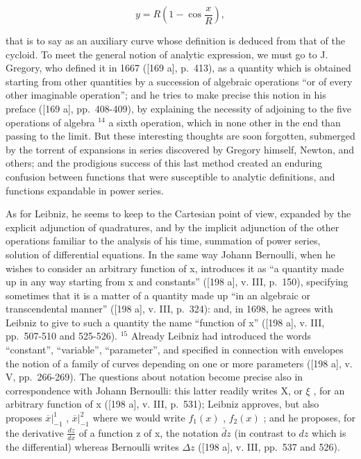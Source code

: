 \[
y = R \left(1 - \cos \frac {x}{R}\right),
\]

that is to say as an auxiliary curve whose definition is deduced from that of the cycloid. To meet the general notion of analytic expression, we must go to J. Gregory, who defined it in 1667 ({[}169 a{]}, p.~413), as a quantity which is obtained starting from other quantities by a succession of algebraic operations ``or of every other imaginable operation''; and he tries to make precise this notion in his preface ({[}169 a{]}, pp.~408-409), by explaining the necessity of adjoining to the five operations of algebra \(^{14}\) a sixth operation, which in none other in the end than passing to the limit. But these interesting thoughts are soon forgotten, submerged by the torrent of expansions in series discovered by Gregory himself, Newton, and others; and the prodigious success of this last method created an enduring confusion between functions that were susceptible to analytic definitions, and functions expandable in power series.

As for Leibniz, he seems to keep to the Cartesian point of view, expanded by the explicit adjunction of quadratures, and by the implicit adjunction of the other operations familiar to the analysis of his time, summation of power series, solution of differential equations. In the same way Johann Bernoulli, when he wishes to consider an arbitrary function of x, introduces it as ``a quantity made up in any way starting from x and constants'' ({[}198 a{]}, v. III, p.~150), specifying sometimes that it is a matter of a quantity made up ``in an algebraic or transcendental manner'' ({[}198 a{]}, v. III, p.~324): and, in 1698, he agrees with Leibniz to give to such a quantity the name ``function of x'' ({[}198 a{]}, v. III, pp.~507-510 and 525-526). \(^{15}\) Already Leibniz had introduced the words ``constant'', ``variable'', ``parameter'', and specified in connection with envelopes the notion of a family of curves depending on one or more parameters ({[}198 a{]}, v. V, pp.~266-269). The questions about notation become precise also in correspondence with Johann Bernoulli: this latter readily writes X, or \(\xi\) , for an arbitrary function of x ({[}198 a{]}, v. III, p.~531); Leibniz approves, but also proposes \(\overline{x}|_{-1}^{1}\) , \(\overline{x}|_{-1}^{2}\) where we would write \(f_{1}(x)\) , \(f_{2}(x)\) ; and he proposes, for the derivative \(\frac{dz}{dx}\) of a function z of x, the notation \(\bar{d}z\) (in contrast to \(dz\) which is the differential) whereas Bernoulli writes \(\Delta z\) ({[}198 a{]}, v. III, pp.~537 and 526).

